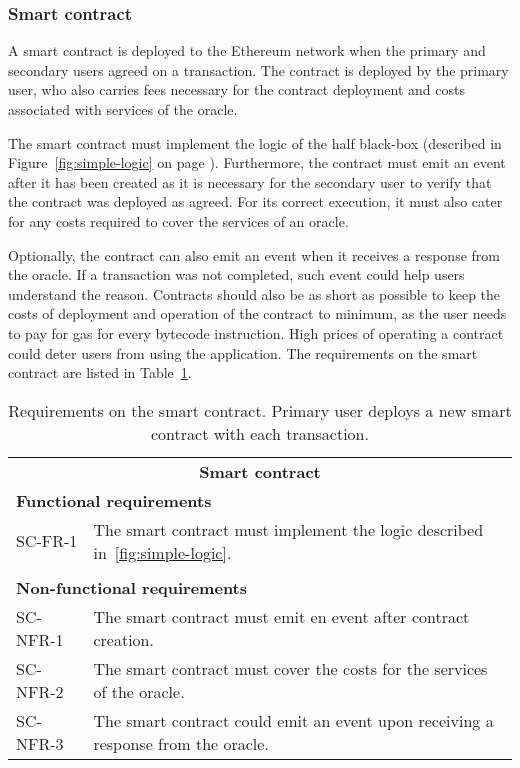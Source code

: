 \subsubsection{Smart contract}
A smart contract is deployed to the Ethereum network when the primary and secondary users agreed on a transaction. The contract is deployed by the primary user, who also carries fees necessary for the contract deployment and costs associated with services of the oracle\footnotemark.
% 

The smart contract must implement the logic of the half black-box (described in Figure~\ref{fig:simple-logic} on page \pageref{fig:simple-logic}). Furthermore, the contract must emit an event after it has been created as it is necessary for the secondary user to verify that the contract was deployed as agreed. For its correct execution, it must also cater for any costs required to cover the services of an oracle.

Optionally, the contract can also emit an event when it receives a response from the oracle. If a transaction was not completed, such event could help users understand the reason. Contracts should also be as short as possible to keep the costs of deployment and operation of the contract to minimum, as the user needs to pay for gas for every bytecode instruction. High prices of operating a contract could deter users from using the application. The requirements on the smart contract are listed in Table~\ref{tab:reqs-smart-contract}.

\begin{table}[ht]
    \centering
    \begin{tabularx}{\textwidth}{|l X|}
    \hline
        \multicolumn{2}{|c|}{\textbf{Smart contract}}\\
        \multicolumn{2}{|l|}{\textbf{Functional requirements}}\\
        SC-FR-1&The smart contract must implement the logic described in~\ref{fig:simple-logic}.\\
        &\\
        \multicolumn{2}{|l|}{\textbf{Non-functional requirements}}\\
        SC-NFR-1&The smart contract must emit en event after contract creation.\\
        SC-NFR-2&The smart contract must cover the costs for the services of the oracle.\\
        SC-NFR-3&The smart contract could emit an event upon receiving a response from the oracle.\\
    \hline
    \end{tabularx}
    \caption{Requirements on the smart contract. Primary user deploys a new smart contract with each transaction.}
    \label{tab:reqs-smart-contract}
\end{table}

